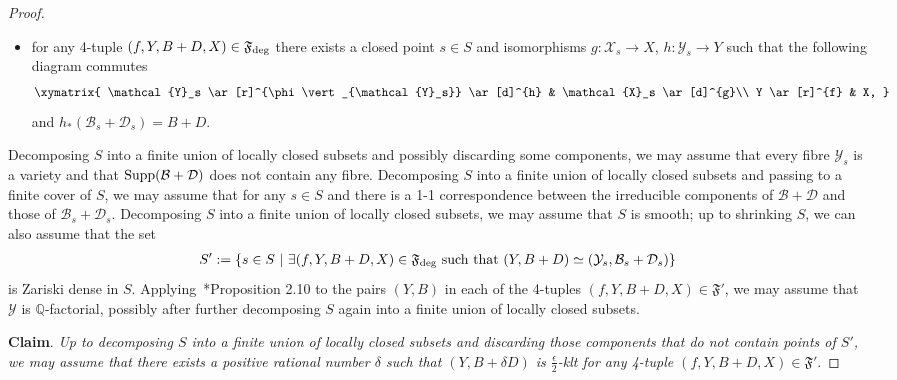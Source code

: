 \documentclass[11pt]{ip-journal}
\theoremstyle{definition}
\newcommand{\supp}{{\rm Supp}}
\begin{document}
\begin{proof}
\begin{itemize}
\item 
for any 4-tuple 
$(f, Y, B+D, X) \in \mathfrak{F}_{\rm{deg}}$ 
there exists a closed point 
$s \in S$ 
and isomorphisms 
$g \colon \mathcal{X}_{s} \to X$, 
$h \colon \mathcal{Y}_s \to Y$ 
such that the following diagram commutes
\begin{align}
\label{comm.square.diag.eqn.1}
\xymatrix{
\mathcal{Y}_s \ar[r]^{\phi\vert_{\mathcal{Y}_s}} \ar[d]^{h} & 
\mathcal{X}_s \ar[d]^{g}\\
Y  \ar[r]^{f} &
X,
}
\end{align}
and 
$h_\ast (\mathcal{B}_s+ \mathcal{D}_s) = B+D$.
\end{itemize}
Decomposing $S$ into a finite union of locally closed subsets and possibly discarding some components, we may assume that every fibre $\mathcal{Y}_s$ is a variety and that $\supp(\mathcal B+\mathcal{D})$ does not contain any fibre. 
Decomposing $S$ into a finite union of locally closed subsets and passing to a finite cover of $S$, we may assume that for any $s\in S$ and there is a 1-1 correspondence between the irreducible components of $\mathcal B+\mathcal{D}$ and those of $\mathcal{B}_s+\mathcal{D}_s$.
Decomposing $S$ into a finite union of locally closed subsets, we may assume that $S$ is smooth;
up to shrinking $S$, we can also assume that the set 
\begin{align*}
   S':= 
   \{s\in S \ \vert \ \exists (f, Y, B+D, X) \in \mathfrak{F}_{{\rm deg}} 
   \textrm{ such that } 
   (Y, B+D) \simeq (\mathcal{Y}_s, \mathcal{B}_s+\mathcal{D}_s)\}
\end{align*}
is Zariski dense in $S$.
Applying~\cite{1810.01990}*{Proposition 2.10} to the pairs 
$(Y, B)$ 
in each of the 4-tuples 
$(f, Y, B+D, X) \in \mathfrak{F}'$, 
we may assume that 
$\mathcal Y$ 
is 
$\mathbb{Q}$-factorial, 
possibly after further decomposing 
$S$ 
again into a finite union of locally closed subsets.

\medskip

{\bf Claim}. 
{\it Up to decomposing 
$S$ 
into a finite union of locally closed subsets and discarding those components that do not contain points of 
$S'$, 
we may assume that there exists a positive rational number 
$\delta$ 
such that 
$(Y, B+\delta D)$ 
is 
$\frac \epsilon 2$-klt 
for any 4-tuple 
$(f, Y, B+D, X) \in \mathfrak{F}'$}.


\end{proof}
\end{document}
